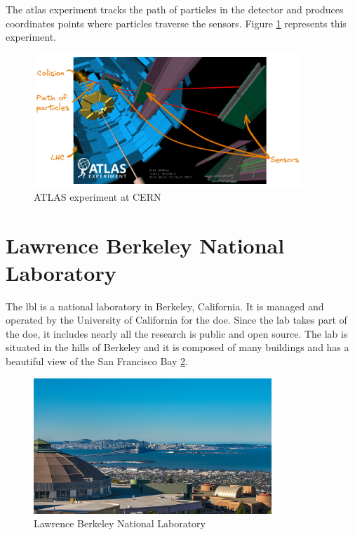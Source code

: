 The \acrfull{atlas} experiment tracks the path of particles in the detector and produces coordinates points where particles traverse the sensors.
Figure \ref{spec:fig:context:physics-simulation:lhc} represents this experiment.
\begin{figure}[ht]
    \centering
    \includegraphics[width=0.9\textwidth]{05-resources/img/spec/experiment-atlas.excalidraw.png}
    \caption{ATLAS experiment at CERN~\cite{atlas-experiment}}
    \label{spec:fig:context:physics-simulation:lhc}
\end{figure}


\section{Lawrence Berkeley National Laboratory}
\label{spec:ch:context:lbl}

The \acrfull{lbl} is a national laboratory in Berkeley, California.
It is managed and operated by the University of California for the \acrfull{doe}.
Since the lab takes part of the \acrshort{doe}, it includes nearly all the research is public and open source.
The lab is situated in the hills of Berkeley and it is composed of many buildings and has a beautiful view of the San Francisco Bay \ref{spec:fig:context:lbl:lab-view}.

\begin{figure}[ht]
    \centering
    \includegraphics[width=0.8\textwidth]{05-resources/img/spec/lab-view.jpg}
    \caption{Lawrence Berkeley National Laboratory}
    \label{spec:fig:context:lbl:lab-view}
\end{figure}


